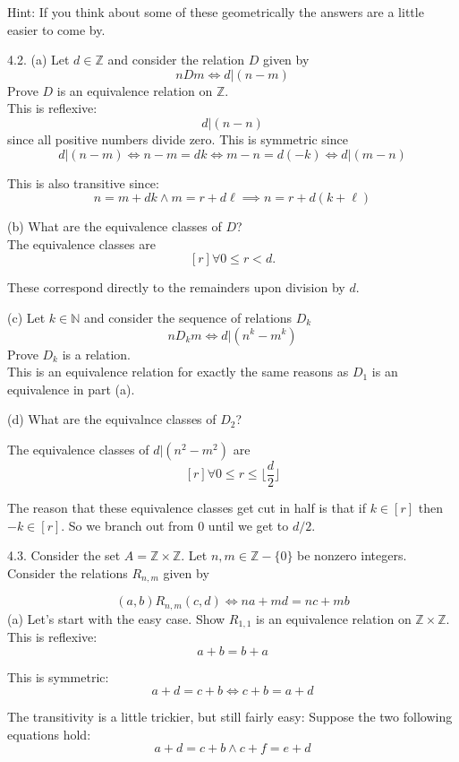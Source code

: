 \documentclass[16 pt]{amsart}
\theoremstyle{definition}
\theoremstyle{remark}
\numberwithin{equation}{subsection}
\newcommand{\Z}{\mathbb{Z}}
\begin{document}
Hint: If you think about some of these geometrically the answers are a little easier to come by.



4.2.  (a) Let $d\in\Z$ and consider the relation $D$ given by
\[
n D m \iff d | (n-m)
\]
Prove $D$ is an equivalence relation on $\Z$.\\

This is reflexive:
\[
d|(n-n)
\]
since all positive numbers divide zero.  This is symmetric since
\[
d|(n-m) \iff n - m = dk \iff m-n = d(-k) \iff d|(m-n)
\]

This is also transitive since:
\[
n = m+dk \wedge m = r+ d\ell \implies n = r + d(k+\ell)
\]


(b) What are the equivalence classes of $D$?\\


The equivalence classes are 
\[
[r] \forall 0\le r < d.
\]

These correspond directly to the remainders upon division by $d$.



(c) Let $k\in\mathbb{N}$ and consider the sequence of relations $D_k$
\[
n D_k m \iff d | (n^k-m^k)
\]
Prove $D_k$ is a relation.\\

This is an equivalence relation for exactly the same reasons as $D_1$ is an equivalence in part (a).




(d) What are the equivalnce classes of $D_2$?


The equivalence classes of $d | (n^2-m^2)$ are 
\[
[r] \forall 0\le r \le \lfloor \frac{d}{2} \rfloor
\]

The reason that these equivalence classes get cut in half is that if $k\in [r]$ then $-k \in [r]$.  So we branch out from 0 until we get to $d/2$.


4.3. Consider the set $A=\Z\times \Z$.  Let $n,m\in\Z-\{0\}$ be nonzero integers.  Consider the relations $R_{n,m}$ given by

\[
(a,b) R_{n,m} (c,d) \iff na+md = nc+mb
\]
(a) Let's start with the easy case.  Show $R_{1,1}$ is an equivalence relation on $\Z\times\Z$.\\



This is reflexive:
\[
a+b = b+a
\]

This is symmetric:
\[
a+d = c+b \iff c+b = a+d
\]

The transitivity is a little trickier, but still fairly easy:  Suppose the two following equations hold:
\[
a+d = c+b  \wedge c + f = e + d
\]
\end{document}
